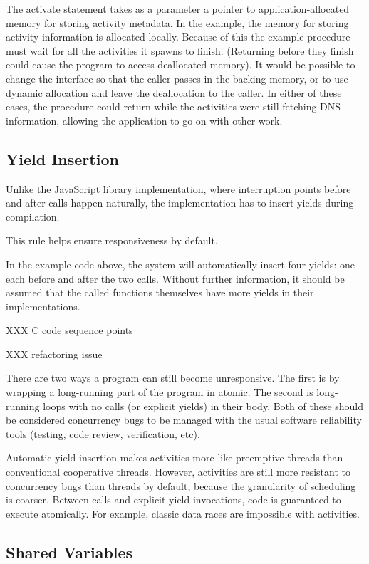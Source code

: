 \documentclass[acmsmall,anonymous,review]{acmart}\settopmatter{printfolios=true,printccs=false,printacmref=false}
\begin{document}
The activate statement takes as a parameter a pointer to application-allocated memory for storing activity metadata.
In the example, the memory for storing activity information is allocated locally.
Because of this the example procedure must wait for all the activities it spawns to finish.
(Returning before they finish could cause the program to access deallocated memory).
It would be possible to change the interface so that the caller passes in the backing memory, or to use dynamic allocation and leave the deallocation to the caller.
In either of these cases, the procedure could return while the activities were still fetching DNS information, allowing the application to go on with other work.

\subsection{Yield Insertion}

Unlike the JavaScript library implementation, where interruption points before and after calls happen naturally, the \charcoal{} implementation has to insert yields during compilation.

This rule helps ensure responsiveness by default.

In the example code above, the system will automatically insert four yields: one each before and after the two calls.
Without further information, it should be assumed that the called functions themselves have more yields in their implementations.

XXX C code sequence points

XXX refactoring issue


There are two ways a program can still become unresponsive.
The first is by wrapping a long-running part of the program in atomic.
The second is long-running loops with no calls (or explicit yields) in their body.
Both of these should be considered concurrency bugs to be managed with the usual software reliability tools (testing, code review, verification, etc).


Automatic yield insertion makes activities more like preemptive threads than conventional cooperative threads.
However, activities are still more resistant to concurrency bugs than threads by default, because the granularity of scheduling is coarser.
Between calls and explicit yield invocations, code is guaranteed to execute atomically.
For example, classic data races are impossible with activities.


\subsection{Shared Variables}
\end{document}
